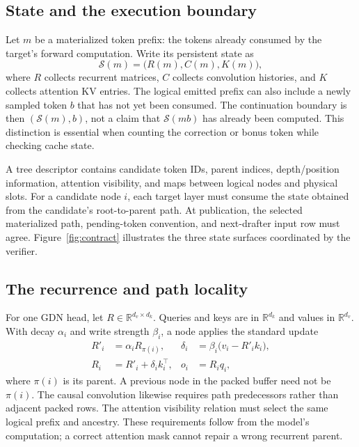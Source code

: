 \documentclass[conference]{IEEEtran}
\begin{document}
\subsection{State and the execution boundary}
Let $m$ be a materialized token prefix: the tokens already consumed by the target's forward computation. Write its persistent state as
\begin{equation}
\mathcal{S}(m)=\bigl(R(m),C(m),K(m)\bigr),
\end{equation}
where $R$ collects recurrent matrices, $C$ collects convolution histories, and $K$ collects attention KV entries. The logical emitted prefix can also include a newly sampled token $b$ that has not yet been consumed. The continuation boundary is then $(\mathcal{S}(m),b)$, not a claim that $\mathcal{S}(mb)$ has already been computed. This distinction is essential when counting the correction or bonus token while checking cache state.

A tree descriptor contains candidate token IDs, parent indices, depth/position information, attention visibility, and maps between logical nodes and physical slots. For a candidate node $i$, each target layer must consume the state obtained from the candidate's root-to-parent path. At publication, the selected materialized path, pending-token convention, and next-drafter input row must agree. Figure~\ref{fig:contract} illustrates the three state surfaces coordinated by the verifier.

\subsection{The recurrence and path locality}
For one GDN head, let $R\in\mathbb{R}^{d_v\times d_k}$. Queries and keys are in $\mathbb{R}^{d_k}$ and values in $\mathbb{R}^{d_v}$. With decay $\alpha_i$ and write strength $\beta_i$, a node applies the standard update~\cite{yang2024gated}
\begin{align}
R'_i &= \alpha_i R_{\pi(i)}, &
\delta_i &= \beta_i\bigl(v_i-R'_i k_i\bigr),\\
R_i &= R'_i+\delta_i k_i^\top, &
o_i &= R_iq_i,
\end{align}
where $\pi(i)$ is its parent. A previous node in the packed buffer need not be $\pi(i)$. The causal convolution likewise requires path predecessors rather than adjacent packed rows. The attention visibility relation must select the same logical prefix and ancestry. These requirements follow from the model's computation; a correct attention mask cannot repair a wrong recurrent parent.
\end{document}
